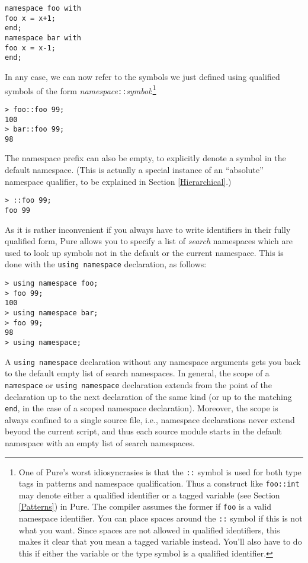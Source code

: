 \documentclass[a4paper,12pt]{article}
\newcommand{\nt}[1]{\textrm{\textit{#1\/}}}
\begin{document}
\begin{lstlisting}
namespace foo with
foo x = x+1;
end;
namespace bar with
foo x = x-1;
end;
\end{lstlisting}

In any case, we can now refer to the symbols we just defined using qualified symbols of the form \nt{namespace}\verb|::|\nt{symbol}:\footnote{One of Pure's worst idiosyncrasies is that the \texttt{::} symbol is used for both type tags in patterns and namespace qualification. Thus a construct like \texttt{foo::int} may denote either a qualified identifier or a tagged variable (see Section \ref{Patterns}) in Pure. The compiler assumes the former if \texttt{foo} is a valid namespace identifier. You can place spaces around the \texttt{::} symbol if this is not what you want. Since spaces are not allowed in qualified identifiers, this makes it clear that you mean a tagged variable instead. You'll also have to do this if either the variable or the type symbol is a qualified identifier.}

\begin{lstlisting}
> foo::foo 99;
100
> bar::foo 99;
98
\end{lstlisting}

The namespace prefix can also be empty, to explicitly denote a symbol in the default namespace. (This is actually a special instance of an ``absolute'' namespace qualifier, to be explained in Section \ref{Hierarchical}.)

\begin{lstlisting}
> ::foo 99;
foo 99
\end{lstlisting}

As it is rather inconvenient if you always have to write identifiers in their fully qualified form, Pure allows you to specify a list of \emph{search} namespaces which are used to look up symbols not in the default or the current namespace. This is done with the \lstinline{using namespace} declaration, as follows:

\begin{lstlisting}
> using namespace foo;
> foo 99;
100
> using namespace bar;
> foo 99;
98
> using namespace;
\end{lstlisting}

A \lstinline{using namespace} declaration without any namespace arguments gets you back to the default empty list of search namespaces. In general, the scope of a \lstinline{namespace} or \lstinline{using namespace} declaration extends from the point of the declaration up to the next declaration of the same kind (or up to the matching \lstinline{end}, in the case of a scoped namespace declaration). Moreover, the scope is always confined to a single source file, i.e., namespace declarations never extend beyond the current script, and thus each source module starts in the default namespace with an empty list of search namespaces.
\end{document}
